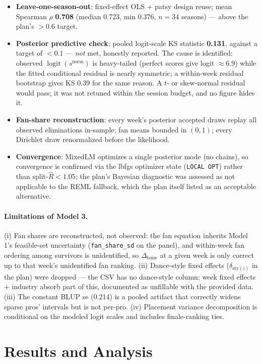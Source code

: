\documentclass[11pt]{article}
\begin{document}
\begin{itemize}
\item \textbf{Leave-one-season-out}: fixed-effect OLS + patsy design
reuse; mean Spearman $\rho$ \textbf{0.708} (median 0.723, min 0.376,
$n = 34$ seasons) --- above the plan's $> 0.6$ target.
\item \textbf{Posterior predictive check}: pooled logit-scale KS
statistic \textbf{0.131}, against a target of $< 0.1$ --- \emph{not}
met, honestly reported. The cause is identified: observed
$\operatorname{logit}(s^{\text{norm}})$ is heavy-tailed (perfect scores
give logit $\approx 6.9$) while the fitted conditional residual is
nearly symmetric; a within-week residual bootstrap gives KS 0.39 for
the same reason. A $t$- or skew-normal residual would pass; it was not
retuned within the session budget, and no figure hides it.
\item \textbf{Fan-share reconstruction}: every week's posterior accepted
draws replay all observed eliminations in-sample; fan means bounded in
$(0,1)$; every Dirichlet draw renormalized before the likelihood.
\item \textbf{Convergence}: MixedLM optimizes a single posterior mode
(no chains), so convergence is confirmed via the lbfgs optimizer state
(\texttt{LOCAL OPT}) rather than split-$\hat{R} < 1.05$; the plan's
Bayesian diagnostic was assessed as not applicable to the REML fallback,
which the plan itself listed as an acceptable alternative.
\end{itemize}

\paragraph{Limitations of Model 3.} (i) Fan shares are reconstructed,
not observed: the fan equation inherits Model 1's feasible-set uncertainty
(\texttt{fan\_share\_sd} on the panel), and within-week fan ordering
among survivors is unidentified, so $\Delta_{\text{fame}}$ at a given
week is only correct up to that week's unidentified fan ranking.
(ii) Dance-style fixed effects ($\delta_{\text{sty}(i)}$ in the plan)
were dropped --- the CSV has no dance-style column; week fixed effects
+ industry absorb part of this, documented as unfillable with the
provided data. (iii) The constant BLUP se (0.214) is a pooled artifact
that correctly widens sparse pros' intervals but is not per-pro.
(iv) Placement variance decomposition is conditional on the modeled
logit scales and includes finale-ranking ties.

\section{Results and Analysis}
\label{sec:results}
\end{document}

